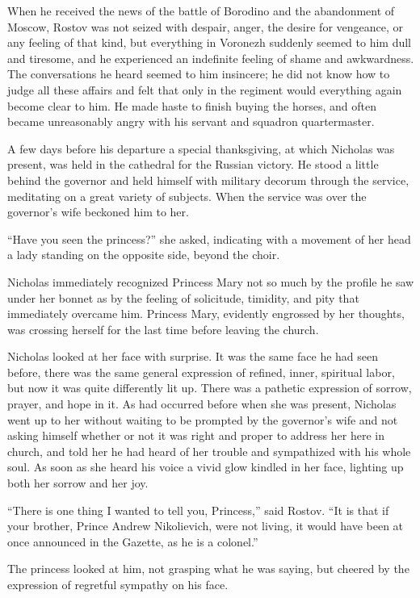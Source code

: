 When he received the news of the battle of Borodino and the
abandonment of Moscow, Rostov was not seized with despair, anger,
the desire for vengeance, or any feeling of that kind, but
everything in Voronezh suddenly seemed to him dull and tiresome,
and he experienced an indefinite feeling of shame and
awkwardness. The conversations he heard seemed to him insincere;
he did not know how to judge all these affairs and felt that only
in the regiment would everything again become clear to him. He
made haste to finish buying the horses, and often became
unreasonably angry with his servant and squadron quartermaster.

A few days before his departure a special thanksgiving, at which
Nicholas was present, was held in the cathedral for the Russian
victory.  He stood a little behind the governor and held himself
with military decorum through the service, meditating on a great
variety of subjects.  When the service was over the governor's
wife beckoned him to her.

``Have you seen the princess?'' she asked, indicating with a
movement of her head a lady standing on the opposite side, beyond
the choir.

Nicholas immediately recognized Princess Mary not so much by the
profile he saw under her bonnet as by the feeling of solicitude,
timidity, and pity that immediately overcame him. Princess Mary,
evidently engrossed by her thoughts, was crossing herself for the
last time before leaving the church.

Nicholas looked at her face with surprise. It was the same face
he had seen before, there was the same general expression of
refined, inner, spiritual labor, but now it was quite differently
lit up. There was a pathetic expression of sorrow, prayer, and
hope in it. As had occurred before when she was present, Nicholas
went up to her without waiting to be prompted by the governor's
wife and not asking himself whether or not it was right and
proper to address her here in church, and told her he had heard
of her trouble and sympathized with his whole soul. As soon as
she heard his voice a vivid glow kindled in her face, lighting up
both her sorrow and her joy.

``There is one thing I wanted to tell you, Princess,'' said
Rostov. ``It is that if your brother, Prince Andrew Nikolievich,
were not living, it would have been at once announced in the
Gazette, as he is a colonel.''

The princess looked at him, not grasping what he was saying, but
cheered by the expression of regretful sympathy on his face.

